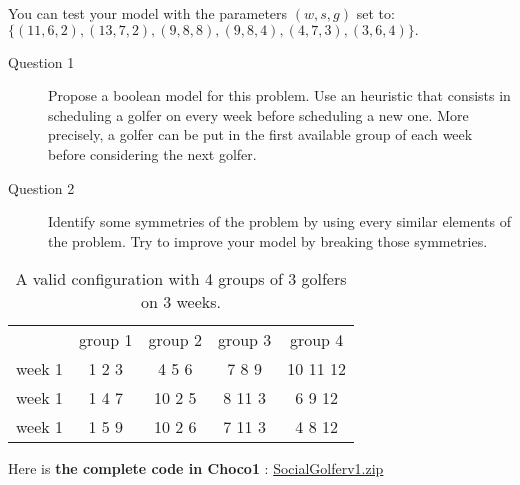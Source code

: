 \begin{note}
You can test your model with the parameters $(w, s, g)$ set to: $\{(11, 6, 2), (13, 7, 2), (9, 8, 8), (9, 8, 4), (4, 7, 3), (3, 6, 4)\}.$
\end{note}

\begin{description}
	\item[Question 1] Propose a boolean model for this problem. Use an heuristic that consists in scheduling a golfer on every week before scheduling a new one. More precisely, a golfer can be put in the first available group of each week before considering the next golfer.
	\item[Question 2] Identify some symmetries of the problem by using every similar elements of the problem. Try to improve your model by breaking those symmetries.
\end{description}

\begin{table}[htbp]
\centering
 	\begin{tabular}{ c c c c c}
		  &  group 1 &  group 2 &  group 3 &  group 4 \\
          \cline{2-5}
		 week 1 &  1 2 3 &  4 5 6 &  7 8 9 &  10 11 12 \\
		 week 1 &  1 4 7 &  10 2 5 &  8 11 3 &  6 9 12 \\
		 week 1 &  1 5 9 &  10 2 6 &  7 11 3 &  4 8 12 \\
	\end{tabular}
\caption{A valid configuration with 4 groups of 3 golfers on 3 weeks.}
\end{table}

Here is \textbf{the complete code in Choco1} : \href{media/zip/socialgolferv1.zip}{SocialGolferv1.zip}

